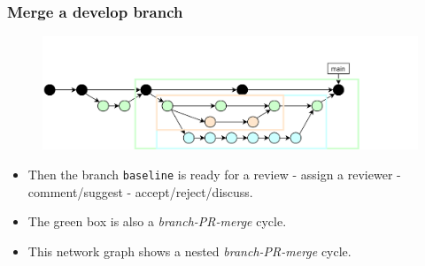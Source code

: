\documentclass[aspectratio=169]{beamer}
\begin{document}
\begin{frame}
	\frametitle{Merge a develop branch}

	\vspace{-.5cm}
	\begin{minipage}[t][5cm][t]{\textwidth}
		\begin{figure}
			\centering
			\includegraphics[width=\textwidth]{./img/dime-gitflow-network-2-6.png}
		\end{figure}
	\end{minipage}

	\vspace{-.5cm}
	\begin{minipage}[t][5cm][t]{\textwidth}
		\begin{itemize}
			\setlength\itemsep{.5em}
			\item Then the branch \texttt{baseline} is ready for a review
			- assign a reviewer - comment/suggest - accept/reject/discuss.
			\item The green box is also a \textit{branch-PR-merge} cycle.
			\item This network graph shows
			a nested \textit{branch-PR-merge} cycle.
		\end{itemize}
	\end{minipage}
\end{frame}
\end{document}
